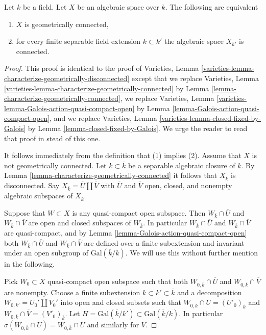 \begin{lemma}
\label{lemma-characterize-geometrically-disconnected}
Let $k$ be a field. Let $X$ be an algebraic space over $k$.
The following are equivalent
\begin{enumerate}
\item $X$ is geometrically connected,
\item for every finite separable field extension $k \subset k'$
the algebraic space $X_{k'}$ is connected.
\end{enumerate}
\end{lemma}

\begin{proof}
This proof is identical to the proof of
Varieties, Lemma \ref{varieties-lemma-characterize-geometrically-disconnected}
except that
we replace
Varieties, Lemma \ref{varieties-lemma-characterize-geometrically-connected}
by Lemma \ref{lemma-characterize-geometrically-connected},
we replace
Varieties, Lemma \ref{varieties-lemma-Galois-action-quasi-compact-open}
by Lemma \ref{lemma-Galois-action-quasi-compact-open}, and
we replace
Varieties, Lemma \ref{varieties-lemma-closed-fixed-by-Galois}
by Lemma \ref{lemma-closed-fixed-by-Galois}.
We urge the reader to read that proof in stead of this one.

\medskip\noindent
It follows immediately from the definition that (1) implies (2).
Assume that $X$ is not geometrically connected.
Let $k \subset \overline{k}$ be a separable algebraic
closure of $k$. By
Lemma \ref{lemma-characterize-geometrically-connected}
it follows that $X_{\overline{k}}$ is disconnected.
Say $X_{\overline{k}} = \overline{U} \amalg \overline{V}$
with $\overline{U}$ and $\overline{V}$ open, closed, and nonempty
algebraic subspaces of $X_{\overline{k}}$.

\medskip\noindent
Suppose that $W \subset X$ is any quasi-compact open subspace.
Then $W_{\overline{k}} \cap \overline{U}$ and
$W_{\overline{k}} \cap \overline{V}$ are open and closed subspaces of
$W_{\overline{k}}$. In particular $W_{\overline{k}} \cap \overline{U}$ and
$W_{\overline{k}} \cap \overline{V}$ are quasi-compact, and by
Lemma \ref{lemma-Galois-action-quasi-compact-open}
both $W_{\overline{k}} \cap \overline{U}$ and
$W_{\overline{k}} \cap \overline{V}$
are defined over a finite subextension and invariant under an
open subgroup of $\text{Gal}(\overline{k}/k)$.
We will use this without further mention in the following.

\medskip\noindent
Pick $W_0 \subset X$ quasi-compact open subspace such that both
$W_{0, \overline{k}} \cap \overline{U}$ and
$W_{0, \overline{k}} \cap \overline{V}$ are nonempty.
Choose a finite subextension $k \subset k' \subset \overline{k}$
and a decomposition $W_{0, k'} = U_0' \amalg V_0'$ into open and closed
subsets such that
$W_{0, \overline{k}} \cap \overline{U} = (U'_0)_{\overline{k}}$ and
$W_{0, \overline{k}} \cap \overline{V} = (V'_0)_{\overline{k}}$.
Let $H = \text{Gal}(\overline{k}/k') \subset \text{Gal}(\overline{k}/k)$.
In particular
$\sigma(W_{0, \overline{k}} \cap \overline{U}) =
W_{0, \overline{k}} \cap \overline{U}$ and similarly for
$\overline{V}$.


\end{proof}
